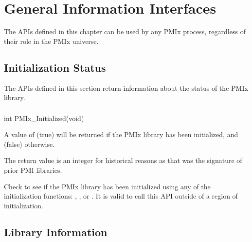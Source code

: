 \chapter{General Information Interfaces}
\label{chap:api_info}

The \acp{API} defined in this chapter can be used by any \ac{PMIx} process, regardless of their role in the \ac{PMIx} universe.


\section{Initialization Status}
\label{chap:api_info:init}

The \acp{API} defined in this section return information about the status of the \ac{PMIx} library.

\subsection{}

\format

\cspecificstart
\begin{codepar}
int PMIx_Initialized(void)
\end{codepar}
\cspecificend

A value of  (true) will be returned if the \ac{PMIx} library has been initialized, and  (false) otherwise.

\rationalestart
The return value is an integer for historical reasons as that was the signature of prior PMI libraries.
\rationaleend

\descr

Check to see if the \ac{PMIx} library has been initialized using any of the initialization functions:
, , or .
It is valid to call this \ac{API} outside of a region of initialization.

\section{Library Information}
\label{chap:api_info:lib}

